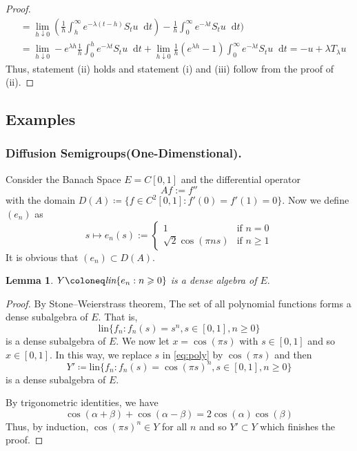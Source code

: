 \documentclass[12pt, reqno]{amsart}
\renewcommand{\geq}{\geqslant}
\newcommand{\1}{\mathbbm 1}
\newcommand*\diff{\mathop{}\!\mathrm{d}}
\theoremstyle{plain}
\newtheorem{lemma}[theorem]{Lemma}
\theoremstyle{definition}
\begin{document}
\begin{proof}
\begin{align*}
   &=\lim_{h \downarrow 0}(\frac{1}{h}\int_{h}^{\infty} e^{-\lambda( t-h)}S_{t} u\diff t)-\frac{1}{h}\int_{0}^{\infty} e^{-\lambda t}S_t u\diff t)\\
   &=\lim_{h \downarrow 0}- e^{\lambda h}\frac{1}{h}\int_{0}^{h} e^{-\lambda t}S_t u\diff t+\lim_{h \downarrow 0}\frac{1}{h}(e^{\lambda h}-1)\int_{0}^{\infty} e^{-\lambda t}S_t u\diff t=-u+\lambda T_{\lambda}u
\end{align*}
Thus, statement (ii) holds and statement (i) and (iii) follow from the proof of (ii).
\end{proof}
\subsection{Examples}
\subsubsection{Diffusion Semigroups(One-Dimenstional).} Consider the Banach Space $E=C[0,1]$ and the differential operator 
\begin{equation*}
Af:=f''
\end{equation*}  
with the domain $D(A)\coloneq\{f\in C^2[0,1]:f'(0)=f'(1)=0\}.$ Now we define $(e_n)$ as
\begin{equation*}
s\mapsto e_n(s) :=\begin{cases}1 & \text{if $n =0$} \\
                                                   \sqrt{2} \cos(\pi n s) & \text{if $n\geq 1$}
                             \end{cases}
\end{equation*}
It is obvious that $(e_n)\subset D(A).$
\begin{lemma}
 $Y\coloneq \emph{lin}\{e_n:n\geq0\}$ is a dense algebra of $E.$
\end{lemma}
\begin{proof}
	By Stone–Weierstrass theorem,  The set of all polynomial functions forms a  dense subalgebra of $E$. That is,
	\begin{equation}\label{eq:poly}
	\text{lin}\{f_n: f_n(s)=s^n, s\in[0,1], n\geq0\}
	\end{equation} is a dense subalgebra of $E.$ We now let $x=\cos(\pi s)$ with $s\in[0,1]$ and so $x\in[0,1]$. In this way, we replace $s$ in \eqref{eq:poly} by $\cos(\pi s)$ and then
	\begin{equation*}
	Y'\coloneq\text{lin}\{f_n: f_n(s)=\cos(\pi s)^n, s\in[0,1], n\geq0\}
	\end{equation*} is a dense subalgebra of $E.$ 
	
	By trigonometric identities, we have
	\begin{equation*}
	\cos(\alpha+\beta)+\cos(\alpha-\beta)=2\cos(\alpha)\cos(\beta)
	\end{equation*}
	Thus, by induction, $\cos(\pi s)^n\in Y$ for all $n$ and so $ Y'\subset Y$ which finishes the proof.
\end{proof}
\end{document}
